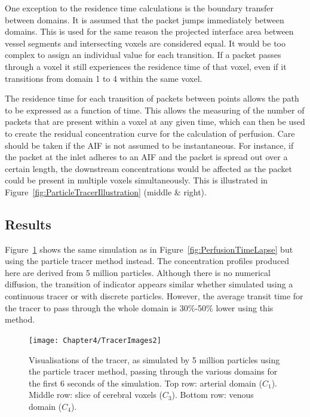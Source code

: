 \documentclass[11pt,english,a4paper,twoside,openright]{report}
\begin{document}
{{{{{{{One exception to the residence time calculations is the boundary transfer between domains. It is assumed that the packet jumps immediately between domains. This is used for the same reason the projected interface area between vessel segments and intersecting voxels are considered equal. It would be too complex to assign an individual value for each transition. If a packet passes through a voxel it still experiences the residence time of that voxel, even if it transitions from domain 1 to 4 within the same voxel.

The residence time for each transition of packets between points allows the path to be expressed as a function of time. This allows the measuring of the number of packets that are present within a voxel at any given time, which can then be used to create the residual concentration curve for the calculation of perfusion. Care should be taken if the AIF is not assumed to be instantaneous. For instance, if the packet at the inlet adheres to an AIF and the packet is spread out over a certain length, the downstream concentrations would be affected as the packet could be present in multiple voxels simultaneously. This is illustrated in Figure~\ref{fig:ParticleTracerIllustration} (middle \& right). 

\subsection{Results}

Figure~\ref{fig:PerfusionTimeLapse2} shows the same simulation as in Figure~\ref{fig:PerfusionTimeLapse} but using the particle tracer method instead. The concentration profiles produced here are derived from 5 million particles. Although there is no numerical diffusion, the transition of indicator appears similar whether simulated using a continuous tracer or with discrete particles. However, the average transit time for the tracer to pass through the whole domain is 30\%-50\% lower using this method. 

\begin{figure}[h]
	\centering
	\texttt{[image: Chapter4/TracerImages2]}
	\caption[Visualisations of the tracer, as simulated by 5 million particles using the particle tracer method, passing through the various domains for the first 6 seconds of the simulation]{Visualisations of the tracer, as simulated by 5 million particles using the particle tracer method, passing through the various domains for the first 6 seconds of the simulation. Top row: arterial domain ($C_{1}$). Middle row: slice of cerebral voxels ($C_{3}$). Bottom row: venous domain ($C_{4}$).}
	\label{fig:PerfusionTimeLapse2}
\end{figure}

}}}}}}}
\end{document}
